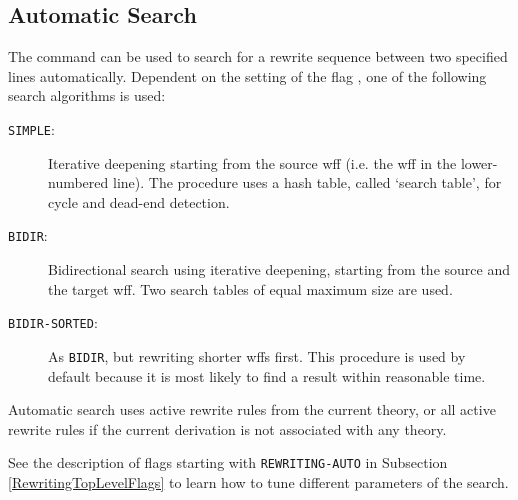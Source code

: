 \subsection{Automatic Search} \label{RewritingTopLevelAuto}
The command  can be used to search for a rewrite sequence
between two specified lines automatically. Dependent on the setting of the
flag , one of the following search
algorithms is used:
\begin{description}
\item [\texttt{SIMPLE}:] Iterative deepening starting from the source wff (i.e.
  the wff in the lower-numbered line). The procedure uses a hash table, called
  `search table', for cycle and dead-end detection.
\item [\texttt{BIDIR}:] Bidirectional search using iterative deepening,
  starting from the source and the target wff. Two search tables of equal
  maximum size are used.
\item [\texttt{BIDIR-SORTED}:] As \texttt{BIDIR}, but rewriting shorter wffs
  first. This procedure is used by default because it is most likely to find a
  result within reasonable time.
\end{description}
Automatic search uses active rewrite rules from the current theory, or all
active rewrite rules if the current derivation is not associated with any
theory.

See the description of flags starting with \texttt{REWRITING-AUTO} in
Subsection \ref{RewritingTopLevelFlags} to learn how to tune different
parameters of the search.


